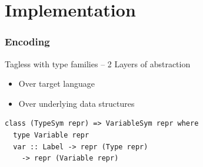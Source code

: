 \documentclass{beamer}
\begin{document}

\section[Implementation]{Implementation}


\begin{frame}[fragile]

\frametitle{Encoding}

Tagless with type families -- 2 Layers of abstraction
\begin{itemize}
	\item Over target language
	\item Over underlying data structures
\end{itemize}

\begin{lstlisting}
class (TypeSym repr) => VariableSym repr where
  type Variable repr
  var :: Label -> repr (Type repr)
    -> repr (Variable repr)
\end{lstlisting}

\end{frame}

\end{document}
